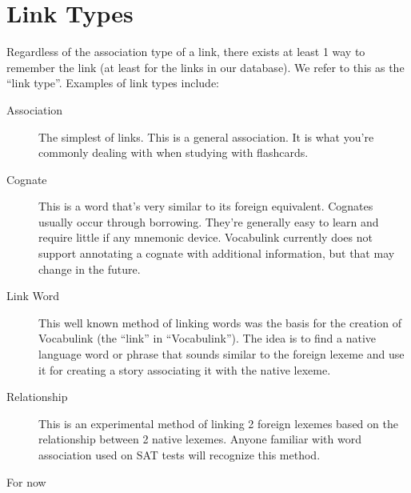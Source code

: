 \section{Link Types}

Regardless of the association type of a link, there exists at least 1 way to
remember the link (at least for the links in our database). We refer to this as
the ``link type''. Examples of link types include:

\begin{description}
\item[Association] The simplest of links. This is a general association. It is
  what you're commonly dealing with when studying with flashcards.
\item[Cognate] This is a word that's very similar to its foreign equivalent.
  Cognates usually occur through borrowing. They're generally easy to learn and
  require little if any mnemonic device. Vocabulink currently does not support
  annotating a cognate with additional information, but that may change in the
  future.
\item[Link Word] This well known method of linking words was the basis for the
  creation of Vocabulink (the ``link'' in ``Vocabulink''). The idea is to find
  a native language word or phrase that sounds similar to the foreign lexeme
  and use it for creating a story associating it with the native lexeme.
\item[Relationship] This is an experimental method of linking 2 foreign lexemes
  based on the relationship between 2 native lexemes. Anyone familiar with word
  association used on SAT tests will recognize this method.
\end{description}

For now
